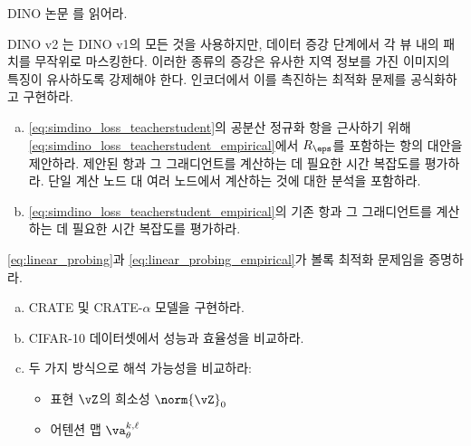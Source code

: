 \documentclass[../../book-main_ko.tex]{subfiles}
\begin{document}
\begin{exercise}
    DINO 논문 \cite{caron2021emerging}를 읽어라.
\end{exercise}

\begin{exercise}
    DINO v2 \cite{oquab2023dinov2}는 DINO v1의 모든 것을 사용하지만, 데이터 증강 단계에서 각 뷰 내의 패치를 무작위로 마스킹한다. 이러한 종류의 증강은 유사한 지역 정보를 가진 이미지의 특징이 유사하도록 강제해야 한다. 인코더에서 이를 촉진하는 최적화 문제를 공식화하고 구현하라.
\end{exercise}

\begin{exercise}
    \phantom{}
    \begin{enumerate}[(a)]
        \item \eqref{eq:simdino_loss_teacherstudent}의 공분산 정규화 항을 근사하기 위해 \eqref{eq:simdino_loss_teacherstudent_empirical}에서 \(R_{\eps}\)를 포함하는 항의 대안을 제안하라. 제안된 항과 그 그래디언트를 계산하는 데 필요한 시간 복잡도를 평가하라. 단일 계산 노드 대 여러 노드에서 계산하는 것에 대한 분석을 포함하라.
        \item \eqref{eq:simdino_loss_teacherstudent_empirical}의 기존 항과 그 그래디언트를 계산하는 데 필요한 시간 복잡도를 평가하라.
    \end{enumerate}
\end{exercise}

\begin{exercise}
    \eqref{eq:linear_probing}과 \eqref{eq:linear_probing_empirical}가 볼록 최적화 문제임을 증명하라.
\end{exercise}

\begin{exercise}
    \phantom{}
    \begin{enumerate}[(a)]
        \item CRATE 및 CRATE-\( \alpha \) 모델을 구현하라.
        \item CIFAR-10 데이터셋에서 성능과 효율성을 비교하라.
        \item 두 가지 방식으로 해석 가능성을 비교하라:
        \begin{itemize}
            \item 표현 \(\vZ\)의 희소성 \(\norm{\vZ}_{0}\)
            \item 어텐션 맵 \(\va_{\theta}^{k, \ell}\)
        \end{itemize}
    \end{enumerate}
\end{exercise}
\end{document}
